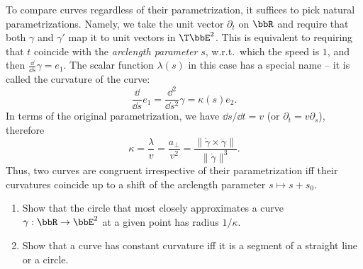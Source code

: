 \begin{example}
    To compare curves regardless of their parametrization, it suffices to pick natural parametrizations. Namely, we take the unit vector $\partial_t$ on $\bbR$ and require that both $\gamma$ and $\gamma'$ map it to unit vectors in $\T\bbE^2$. This is equivalent to requiring that $t$ coincide with the \emph{arclength parameter} $s$, w.r.t.\ which the speed is $1$, and then $\frac{\dd}{\dd s} \gamma=e_1$. The scalar function $\lambda(s)$ in this case has a special name -- it is called the curvature of the curve:
    \[\frac{\dd}{\dd s}e_1=\frac{\dd^2}{\dd s^2}\gamma=\kappa(s)e_2.\]
    In terms of the original parametrization, we have $\dd s/\dd t=v$ (or $\partial_t=v\partial_s$), therefore 
    \[\kappa=\frac{\lambda}{v}=\frac{a_{\perp}}{v^2}=\frac{\lVert\dot\gamma\times \ddot\gamma\rVert}{\lVert\dot\gamma\rVert^3}.\]
    Thus, two curves are congruent irrespective of their parametrization iff their curvatures coincide up to a shift of the arclength parameter $s\mapsto s+s_0$.
\end{example}

\begin{xca}
    \begin{enumerate}
        \item Show that the circle that most closely approximates a curve $\gamma:\bbR\to \bbE^2$ at a given point has radius $1/\kappa$.
        \item  Show that a curve has constant curvature iff it is a segment of a straight line or a circle.
    \end{enumerate}
\end{xca}

